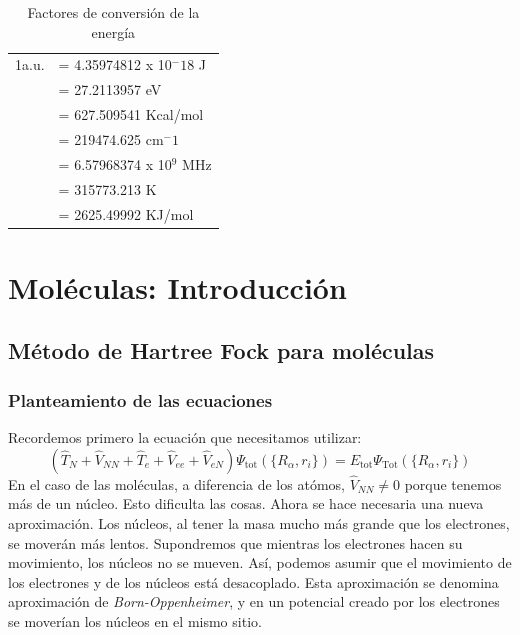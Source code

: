 \documentclass{tufte-book}
\begin{document}
\begin{table}[h!]
\centering
	\scriptsize
	\begin{tabular}{ll}
     \toprule
		1a.u. & =  4.35974812 x 10$^−18$ J  \\
		         &  =  27.2113957 eV \\
	             &  = 627.509541 Kcal/mol \\ 
		         & = 219474.625 cm$^−1$ \\ 
		        & = 6.57968374 x 10$^9$ MHz \\ 
		        & = 315773.213 K \\
		        & = 2625.49992 KJ/mol \\ 
    \bottomrule
    \end{tabular}
    \caption{Factores de conversión de la energía}
    \label{tb:commands}
\end{table}

\chapter{Moléculas: Introducción}

\section{Método de Hartree Fock para moléculas}
\subsection{Planteamiento de las ecuaciones}
Recordemos primero la ecuación que necesitamos utilizar:
\begin{equation}
    (\hat{T}_N + \hat{V}_{NN} + \hat{T}_e + \hat{V}_{ee} +\hat{V}_{eN})\Psi_\mathrm{tot}(\{R_\alpha,r_i\}) 
    = E_\mathrm{tot}\Psi_\mathrm{Tot}(\{R_\alpha,r_i\}) 
\end{equation}
En el caso de las moléculas, a diferencia de los atómos, 
$\hat{V}_{NN}\neq0$ porque tenemos más de un núcleo. Esto 
dificulta las cosas. Ahora se hace necesaria una nueva 
aproximación. Los núcleos, al tener la masa mucho más grande
que los electrones, se moverán más lentos. Supondremos que
mientras los electrones hacen su movimiento, los núcleos no
se mueven. Así, podemos asumir que el movimiento de los 
electrones y de los núcleos está desacoplado. Esta aproximación
se denomina aproximación de \textit{Born-Oppenheimer}, y en
un potencial creado por los electrones se moverían los núcleos
en el mismo sitio. 
\end{document}
